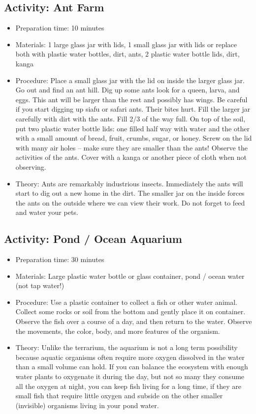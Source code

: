 \subsection{Activity: Ant Farm}
\begin{itemize}
\item{Preparation time: 10 minutes}
\item{Materials: 1 large glass jar with lids, 1 small glass jar with lids or replace both with plastic water bottles, dirt, ants, 2 plastic water bottle lids, dirt, kanga}
\item{Procedure: Place a small glass jar with the lid on inside the larger glass jar. Go out and find an ant hill. Dig up some ants look for a queen, larva, and eggs. This ant will be larger than the rest and possibly has wings. Be careful if you start digging up siafu or safari ants. Their bites hurt. Fill the larger jar carefully with dirt with the ants. Fill 2/3 of the way full. On top of the soil, put two plastic water bottle lids: one filled half way with water and the other with a small amount of bread, fruit, crumbs, sugar, or honey. Screw on the lid with many air holes – make sure they are smaller than the ants! Observe the activities of the ants. Cover with a kanga or another piece of cloth when not observing.}
\item{Theory: Ants are remarkably industrious insects. Immediately the ants will start to dig out a new home in the dirt. The smaller jar on the inside forces the ants on the outside where we can view their work. Do not forget to feed and water your pets.}
\end{itemize}

\subsection{Activity: Pond / Ocean Aquarium}
\begin{itemize}
\item{Preparation time: 30 minutes}
\item{Materials: Large plastic water bottle or glass container, pond / ocean water (not tap water!)}
\item{Procedure: Use a plastic container to collect a fish or other water animal. Collect some rocks or soil from the bottom and gently place it on container. Observe the fish over a course of a day, and then return to the water. Observe the movements, the color, body, and more features of the organism.}
\item{Theory: Unlike the terrarium, the aquarium is not a long term possibility because aquatic organisms often require more oxygen dissolved in the water than a small volume can hold. If you can balance the ecosystem with enough water plants to oxygenate it during the day, but not so many they consume all the oxygen at night, you can keep fish living for a long time, if they are small fish that require little oxygen and subside on the other smaller (invisible) organisms living in your pond water.}
\end{itemize}


